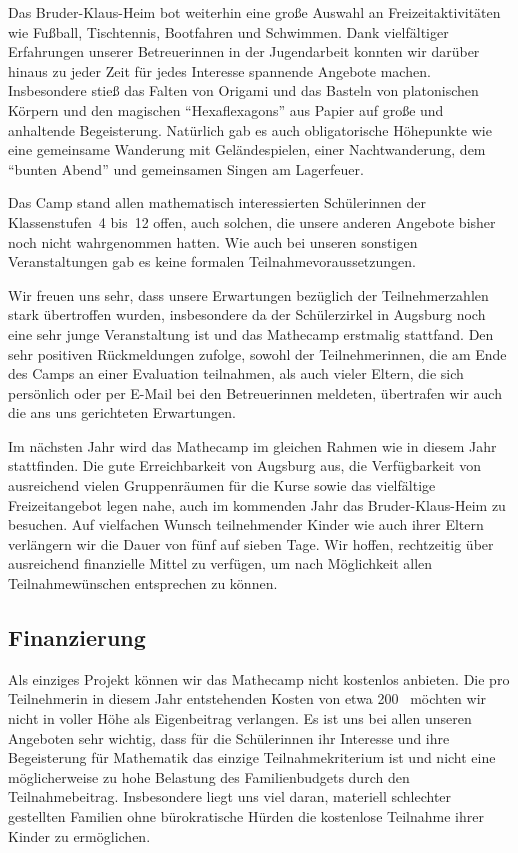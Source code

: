 \documentclass[12pt]{zettel}
\newcommand{\twopics}[2]{%
  \begin{figure}[b]%
    \vspace*{0.5cm}%
    \makebox[\textwidth][c]{%
      \texttt{[image: impressionen/\#1]}%
      \hspace*{1cm}%
      \texttt{[image: impressionen/\#2]}%
    }%
    \vspace*{-1cm}%
  \end{figure}
}
\begin{document}
\twopics{klein-07}{klein-08}

Das Bruder-Klaus-Heim bot weiterhin eine große Auswahl an Freizeitaktivitäten wie Fußball, Tischtennis, Bootfahren und Schwimmen. Dank vielfältiger Erfahrungen unserer Betreuerinnen
in der Jugendarbeit konnten wir darüber hinaus zu jeder Zeit für jedes Interesse spannende Angebote machen. Insbesondere stieß das Falten von Origami und das Basteln von platonischen
Körpern und den magischen "`Hexaflexagons"' aus Papier auf große und anhaltende Begeisterung. Natürlich gab es auch obligatorische Höhepunkte wie eine gemeinsame
Wanderung mit Geländespielen, einer Nachtwanderung, dem "`bunten Abend"' und gemeinsamen Singen am Lagerfeuer.

Das Camp stand allen mathematisch interessierten Schülerinnen der
Klassenstufen~4 bis~12 offen, auch solchen, die unsere anderen Angebote bisher
noch nicht wahrgenommen hatten. Wie auch bei unseren sonstigen Veranstaltungen
gab es keine formalen Teilnahmevoraussetzungen.

Wir freuen uns sehr, dass unsere Erwartungen bezüglich der Teilnehmerzahlen stark übertroffen wurden, insbesondere da der Schülerzirkel in Augsburg noch eine sehr junge
Veranstaltung ist und das Mathecamp erstmalig stattfand. Den sehr positiven Rückmeldungen zufolge, sowohl der Teilnehmerinnen, die am Ende des Camps an einer Evaluation
teilnahmen, als auch vieler Eltern, die sich persönlich oder per E-Mail bei den Betreuerinnen meldeten, übertrafen wir auch die ans uns gerichteten Erwartungen.

Im nächsten Jahr wird das Mathecamp im gleichen Rahmen wie in diesem Jahr stattfinden. Die gute Erreichbarkeit von Augsburg aus, die Verfügbarkeit von ausreichend vielen
Gruppenräumen für die Kurse sowie das vielfältige Freizeitangebot legen nahe, auch im kommenden Jahr das Bruder-Klaus-Heim zu besuchen. Auf vielfachen Wunsch teilnehmender Kinder wie
auch ihrer Eltern verlängern wir die Dauer von fünf auf sieben Tage. Wir hoffen, rechtzeitig über ausreichend finanzielle Mittel zu verfügen, um nach Möglichkeit allen
Teilnahmewünschen entsprechen zu können.


\subsection{Finanzierung}

Als einziges Projekt können wir das Mathecamp nicht kostenlos anbieten. Die pro Teilnehmerin in diesem
Jahr entstehenden Kosten von etwa 200~\texteuro{} möchten wir nicht in voller Höhe als Eigenbeitrag verlangen. Es ist uns bei allen unseren Angeboten sehr wichtig, dass für die
Schülerinnen ihr Interesse und ihre Begeisterung für Mathematik das einzige Teilnahmekriterium ist und nicht eine möglicherweise zu hohe Belastung des Familienbudgets durch den
Teilnahmebeitrag. Insbesondere liegt uns viel daran, materiell schlechter gestellten Familien ohne bürokratische Hürden die kostenlose Teilnahme ihrer Kinder zu ermöglichen.
\end{document}
